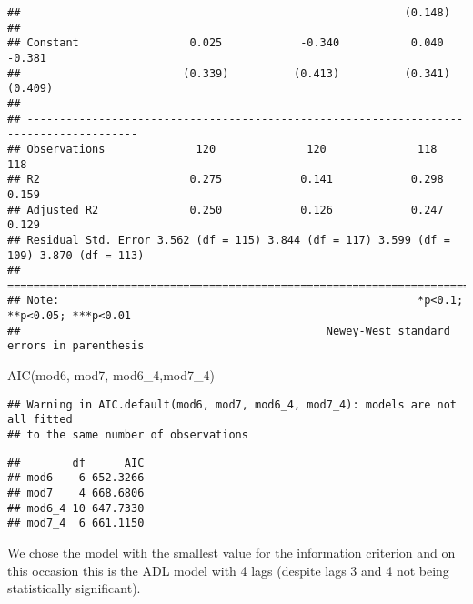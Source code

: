 \documentclass[
]{article}
\newenvironment{Shaded}{\begin{snugshade}}{\end{snugshade}}
\newcommand{\FunctionTok}[1]{\textcolor[rgb]{0.00,0.00,0.00}{#1}}
\newcommand{\NormalTok}[1]{#1}
\begin{document}
\begin{verbatim}
##                                                           (0.148)                      
##                                                                                        
## Constant                 0.025            -0.340           0.040            -0.381     
##                         (0.339)          (0.413)          (0.341)          (0.409)     
##                                                                                        
## ---------------------------------------------------------------------------------------
## Observations              120              120              118              118       
## R2                       0.275            0.141            0.298            0.159      
## Adjusted R2              0.250            0.126            0.247            0.129      
## Residual Std. Error 3.562 (df = 115) 3.844 (df = 117) 3.599 (df = 109) 3.870 (df = 113)
## =======================================================================================
## Note:                                                       *p<0.1; **p<0.05; ***p<0.01
##                                               Newey-West standard errors in parenthesis
\end{verbatim}

\begin{Shaded}
\begin{Highlighting}[]
\FunctionTok{AIC}\NormalTok{(mod6, mod7, mod6\_4,mod7\_4)}
\end{Highlighting}
\end{Shaded}

\begin{verbatim}
## Warning in AIC.default(mod6, mod7, mod6_4, mod7_4): models are not all fitted
## to the same number of observations
\end{verbatim}

\begin{verbatim}
##        df      AIC
## mod6    6 652.3266
## mod7    4 668.6806
## mod6_4 10 647.7330
## mod7_4  6 661.1150
\end{verbatim}

We chose the model with the smallest value for the information criterion
and on this occasion this is the ADL model with 4 lags (despite lags 3
and 4 not being statistically significant).
\end{document}
